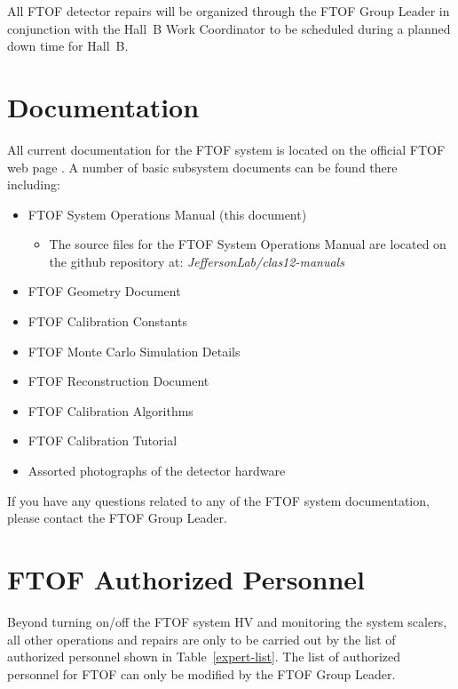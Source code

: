 \documentclass[12pt]{article}
\begin{document}
All FTOF detector repairs will be organized through the FTOF Group Leader in 
conjunction with the Hall~B Work Coordinator to be scheduled during a planned down 
time for Hall~B.

\clearpage

\vfil
\eject

\section{Documentation}

All current documentation for the FTOF system is located on the official FTOF web page
\cite{ftof-web}. A number of basic subsystem documents can be found there including:

\begin{itemize}
\item FTOF System Operations Manual (this document)
 \begin{itemize}
   \item The source files for the FTOF System Operations Manual are located on the
         github repository at: {\it JeffersonLab/clas12-manuals}
 \end{itemize}
\item FTOF Geometry Document
\item FTOF Calibration Constants
\item FTOF Monte Carlo Simulation Details
\item FTOF Reconstruction Document
\item FTOF Calibration Algorithms
\item FTOF Calibration Tutorial
\item Assorted photographs of the detector hardware
\end{itemize}

If you have any questions related to any of the FTOF system documentation, please 
contact the FTOF Group Leader.

\section{FTOF Authorized Personnel}
\label{personnel}

Beyond turning on/off the FTOF system HV and monitoring the system scalers, all other 
operations and repairs are only to be carried out by the list of authorized personnel 
shown in Table~\ref{expert-list}. The list of authorized personnel for FTOF can only 
be modified by the FTOF Group Leader.
\end{document}
